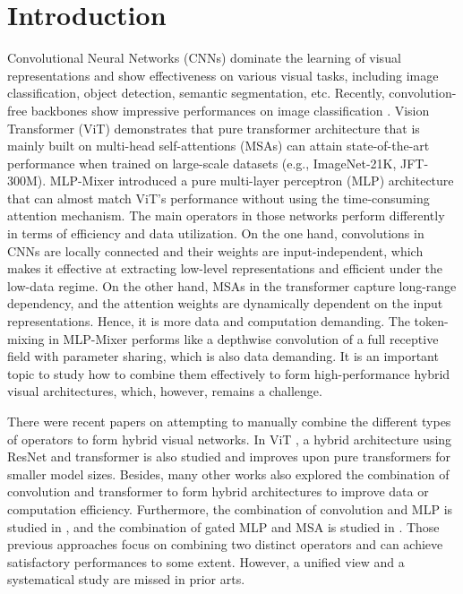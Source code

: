 \documentclass[runningheads]{llncs}
\begin{document}
\section{Introduction}
\label{sec:intro}
Convolutional Neural Networks (CNNs) dominate the learning of visual representations and show effectiveness on various visual tasks, including image classification, object detection, semantic segmentation, etc. 
Recently, convolution-free backbones show impressive performances on image classification \cite{imagenet}. Vision Transformer (ViT) \cite{vit} demonstrates that pure transformer architecture that is mainly built on multi-head self-attentions (MSAs) can attain state-of-the-art performance when trained on large-scale datasets (e.g., ImageNet-21K, JFT-300M). 
MLP-Mixer \cite{mixer} introduced a pure multi-layer perceptron (MLP) architecture that can almost match ViT's performance without using the time-consuming attention mechanism. 
The main operators in those networks perform differently in terms of efficiency and data utilization.
On the one hand, convolutions in CNNs are locally connected and their weights are input-independent, which makes it effective at extracting low-level representations and efficient under the low-data regime. On the other hand, MSAs in the transformer capture long-range dependency, and the attention weights are dynamically dependent on the input representations. Hence, it is more data and computation demanding. The token-mixing in MLP-Mixer performs like a depthwise convolution of a full receptive field with parameter sharing, which is also data demanding. It is an important topic to study how to combine them effectively to form high-performance hybrid visual architectures, which, however, remains a challenge.


There were recent papers on attempting to manually combine the different types of operators to form hybrid visual networks. In ViT \cite{vit}, a hybrid architecture using ResNet and transformer is also studied and improves upon pure transformers for smaller model sizes. Besides, many other works \cite{convit,coatnet,yuan2021incorporating,cvt,cmt,nasvit,container} also explored the combination of convolution and transformer to form hybrid architectures to improve data or computation efficiency. Furthermore, the combination of convolution and MLP is studied in \cite{convmlp}, and the combination of gated MLP and MSA is studied in \cite{gmlp}. Those previous approaches focus on combining two distinct operators and can achieve satisfactory performances to some extent. However, a unified view and a systematical study are missed in prior arts.
\end{document}
